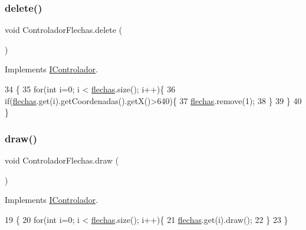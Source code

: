 \subsubsection{\texorpdfstring{delete()}{delete()}}
{\footnotesize\ttfamily void Controlador\+Flechas.\+delete (\begin{DoxyParamCaption}{ }\end{DoxyParamCaption})\hspace{0.3cm}{\ttfamily [inline]}}



Implements \mbox{\hyperlink{interface_i_controlador_a6a799d4959078e9b84d9de7fee44e0ba}{I\+Controlador}}.


\begin{DoxyCode}
34                         \{
35         \textcolor{keywordflow}{for}(\textcolor{keywordtype}{int} i=0; i < \mbox{\hyperlink{class_controlador_flechas_a1214f7644979b0d063796611a3965201}{flechas}}.size(); i++)\{
36             \textcolor{keywordflow}{if}(\mbox{\hyperlink{class_controlador_flechas_a1214f7644979b0d063796611a3965201}{flechas}}.get(i).getCoordenadas().getX()>640)\{
37                 \mbox{\hyperlink{class_controlador_flechas_a1214f7644979b0d063796611a3965201}{flechas}}.remove(1);
38             \}
39         \}
40     \}
\end{DoxyCode}
\mbox{\label{class_controlador_flechas_a4a4d76786169ef23360cbe57b8c81df2}} 
\subsubsection{\texorpdfstring{draw()}{draw()}}
{\footnotesize\ttfamily void Controlador\+Flechas.\+draw (\begin{DoxyParamCaption}{ }\end{DoxyParamCaption})\hspace{0.3cm}{\ttfamily [inline]}}



Implements \mbox{\hyperlink{interface_i_controlador_a220648ff53334f380d52e2d2ec78e2e8}{I\+Controlador}}.


\begin{DoxyCode}
19                       \{
20         \textcolor{keywordflow}{for}(\textcolor{keywordtype}{int} i=0; i < \mbox{\hyperlink{class_controlador_flechas_a1214f7644979b0d063796611a3965201}{flechas}}.size(); i++)\{
21             \mbox{\hyperlink{class_controlador_flechas_a1214f7644979b0d063796611a3965201}{flechas}}.get(i).draw();
22         \}
23     \}
\end{DoxyCode}
\mbox{\label{class_controlador_flechas_afcc63da58b6dd22715c017593731577e}} 
